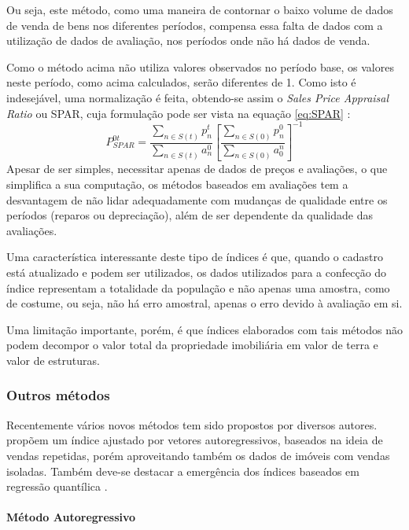 \documentclass[
	12pt,				%
	oneside,			%
	a4paper,			%
	chapter=TITLE,		%
	section=TITLE,		%
	english,			%
	brazil				%
	]{abntex2}
\begin{document}
\begin{refsection}
Ou seja, este método, como uma maneira de contornar o baixo volume de dados de
venda de bens nos diferentes períodos, compensa essa falta de dados com a
utilização de dados de avaliação, nos períodos onde não há dados de venda.

Como o método acima não utiliza valores observados no período base, os valores
neste período, como acima calculados, serão diferentes de 1. Como isto é
indesejável, uma normalização é feita, obtendo-se assim o \emph{Sales Price Appraisal
Ratio} ou SPAR, cuja formulação pode ser vista na equação \eqref{eq:SPAR}
\autocite[75]{rppi}:
\begin{equation}
P_{SPAR}^{0t} = \frac{\sum\limits_{n \in S(t)} p_n^t}{\sum\limits_{n \in S(t)} a_n^0} \left [ \frac{\sum\limits_{n \in S(0)} p_n^0}{\sum\limits_{n \in S(0)} a_0^n} \right ]^{-1}
\label{eq:SPAR}
\end{equation}
Apesar de ser simples, necessitar apenas de dados de preços e avaliações, o que
simplifica a sua computação, os métodos baseados em avaliações tem a desvantagem
de não lidar adequadamente com mudanças de qualidade entre os períodos (reparos
ou depreciação), além de ser dependente da qualidade das avaliações.

Uma característica interessante deste tipo de índices é que, quando o cadastro
está atualizado e podem ser utilizados, os dados utilizados para a confecção do
índice representam a totalidade da população e não apenas uma amostra, como de
costume, ou seja, não há erro amostral, apenas o erro devido à avaliação em si.

Uma limitação importante, porém, é que índices elaborados com tais métodos não
podem decompor o valor total da propriedade imobiliária em valor de terra e
valor de estruturas.

\hypertarget{outros-muxe9todos}{%
\subsubsection{Outros métodos}\label{outros-muxe9todos}}

Recentemente vários novos métodos tem sido propostos por diversos autores.
\textcite{nagaraja2011} propõem um índice ajustado por vetores autoregressivos, baseados
na ideia de vendas repetidas, porém aproveitando também os dados de imóveis com
vendas isoladas. Também deve-se destacar a emergência dos índices baseados em
regressão quantílica \autocites{Coulson}{ZHANG201785}{Wen}.

\hypertarget{muxe9todo-autoregressivo}{%
\paragraph{Método Autoregressivo}\label{muxe9todo-autoregressivo}}


\end{refsection}
\end{document}
